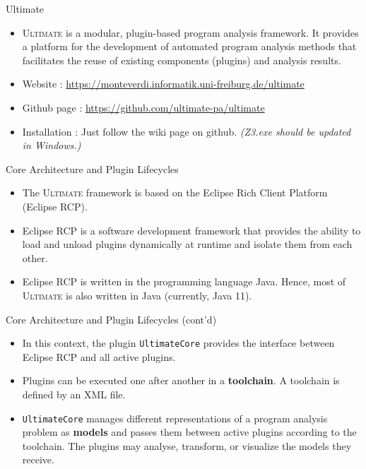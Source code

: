 \documentclass[12pt]{beamer}
\subtitle{(Based on [Daniel Dietsch : Automated verification of system requirements and software specifications. 2016.])}
\author{林宏陽、周若涓}
\newcommand{\code}[1]{\texttt{#1}}
\newcommand{\Note}[1]{\textsl{\small(#1)}}
\newcommand{\ultimate}{\textsc{Ultimate }}
\newcommand{\ultimateURL}{\url{https://monteverdi.informatik.uni-freiburg.de/ultimate}}
\begin{document}
\begin{frame}
	\maketitle
\end{frame}

\begin{frame}{Ultimate}
  	\begin{itemize}
		\item \ultimate is a modular, plugin-based program analysis framework. It provides a platform for the development of automated program analysis methods that facilitates the reuse of existing components (plugins) and analysis results.
		\item Website : \ultimateURL
		\item Github page : \url{https://github.com/ultimate-pa/ultimate}
	  	\item Installation : Just follow the wiki page on github. \Note{Z3.exe should be updated in Windows.}
	\end{itemize}
\end{frame}

\begin{frame}{Core Architecture and Plugin Lifecycles}
  	\begin{itemize}
		\item The \ultimate framework is based on the Eclipse Rich Client Platform
	(Eclipse RCP).
		\item Eclipse RCP is a software development framework that provides  the ability to load and unload plugins dynamically at runtime and isolate them from each other.
		\item Eclipse RCP is written in the programming language Java.
		Hence, most of \ultimate is also written in Java (currently, Java 11).
  	\end{itemize}
\end{frame}

\begin{frame}{Core Architecture and Plugin Lifecycles (cont'd)}
	\begin{itemize}
	  	\item  In this context, the plugin \code{UltimateCore} provides the interface between Eclipse RCP and all active plugins.
	  	\item  Plugins can be executed one after another in a \textbf{toolchain}. A toolchain is defined by an XML file.
	  	\item \code{UltimateCore} manages different representations of a program analysis problem as \textbf{models} and passes them between active plugins according to the toolchain. The plugins may analyse, transform, or visualize the models they receive.
	\end{itemize}
\end{frame}
\end{document}
